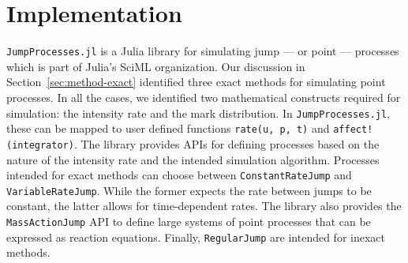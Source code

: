 \documentclass{juliacon}
\numberwithin{equation}{section}
\begin{document}



\section{Implementation} \label{sec:implementation}

\texttt{JumpProcesses.jl} is a Julia library for simulating jump --- or point --- processes which is part of Julia's SciML organization.
Our discussion in Section~\ref{sec:method-exact} identified three exact methods for simulating point processes. In all the cases, we identified two mathematical constructs required for simulation: the intensity rate and the mark distribution. In \texttt{JumpProcesses.jl}, these can be mapped to user defined functions \texttt{rate(u, p, t)} and \texttt{affect!(integrator)}. The library provides APIs for defining processes based on the nature of the intensity rate and the intended simulation algorithm. Processes intended for exact methods can choose between \texttt{ConstantRateJump} and \texttt{VariableRateJump}. While the former expects the rate between jumps to be constant, the latter allows for time-dependent rates. The library also provides the \texttt{MassActionJump} API to define large systems of point processes that can be expressed as reaction equations. Finally, \texttt{RegularJump} are intended for inexact methods.
\end{document}
